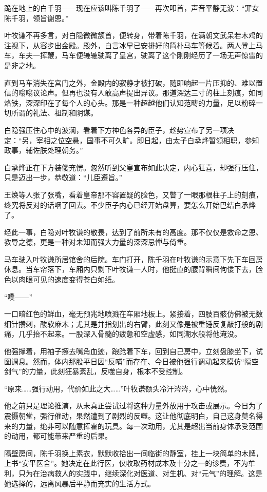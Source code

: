 跪在地上的白千羽——现在应该叫陈千羽了——再次叩首，声音平静无波：“罪女陈千羽，领旨谢恩。”

叶牧谦不再多言，对白隐微微颔首，便转身，带着陈千羽，在满朝文武呆若木鸡的注视下，从容步出金殿。殿外，白言冰早已安排好的简朴马车等候着。两人登上马车，车夫一挥鞭，马车便辘辘驶离了皇宫，驶离了这个刚刚经历了一场无声惊雷的是非之地。

直到马车消失在宫门之外，金殿内的寂静才被打破，随即响起一片压抑的、难以置信的嗡嗡议论声。但再也没有人敢高声提出异议。那道深达三寸的柱上刻痕，如同烙铁，深深印在了每个人的心头。那是一种超越他们认知范畴的力量，足以粉碎一切所谓的礼法、祖制和阴谋。

白隐强压住心中的波澜，看着下方神色各异的臣子，趁势宣布了另一项决定：“另，宰相之位空悬，国事不可久旷。即日起，由太子白承烨暂领相职，参知政事，辅佐朕处理朝务。”

白承烨正在下方装傻充愣。忽然听到父皇宣布如此决定，内心狂喜，却强行压住，只是迈出一步，恭敬道：“儿臣遵旨。”

王焕等人张了张嘴，看着皇帝那不容置疑的脸色，又瞥了一眼那根柱子上的刻痕，终究将反对的话咽了回去。不少臣子内心已经开始盘算，要怎么开始巴结白承烨了。

经此一事，白隐对叶牧谦的敬畏，达到了前所未有的高度。那不仅仅是救命之恩、教导之德，更是一种对未知而强大力量的深深忌惮与倚重。

马车驶入叶牧谦所居馆舍的后院。车门打开，陈千羽在叶牧谦的示意下先下车回房休息。当车帘落下，车厢内只剩下叶牧谦一人时，他挺直的腰背瞬间佝偻下去，脸色以肉眼可见的速度变得苍白如纸。

“噗——”

一口暗红色的鲜血，毫无预兆地喷溅在车厢地板上。紧接着，四肢百骸仿佛被无数细针攒刺，酸软麻木；尤其是并指划出的右臂，此刻又像是被重锤反复敲打般的剧痛，几乎抬不起来。一股深入骨髓的疲惫和空虚感，如同潮水般将他淹没。

他强撑着，用袖子擦去嘴角血迹，踉跄着下车，回到自己房中，立刻盘膝坐下，试图调息。然而，体内那股平日因“反哺”而存在、今日被他强行调动起来模仿“隔空剑气”的力量，此刻狂暴紊乱，反噬自身，根本不受控制。

“原来……强行动用，代价如此之大……”叶牧谦额头冷汗涔涔，心中恍然。

他之前只是理论推演，从未真正尝试过将这种力量外放用于攻击或展示。今日为了震慑朝堂，强行催动，果然遭到了剧烈的反噬。这让他彻底明白，自己这身莫名得来的力量，绝非可以随意挥霍的玩具。每一次动用，尤其是超出当前身体承受范围的动用，都可能带来严重的后果。

隔壁房间，陈千羽换上素衣，默默收拾出一间临街的静室，挂上一块简单的木牌，上书“安平医舍”。她决定在此行医，仅收取药材成本及十分之一的诊费，不为牟利，只为在治病救人的实践中，继续深化对医道、对生机、对“元气”的理解。这是她选择的，远离风暴后平静而充实的生活方式。

